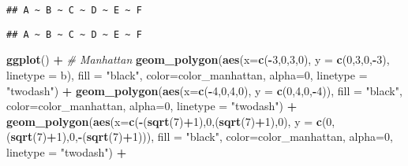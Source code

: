 \documentclass[]{article}
\newenvironment{Shaded}{\begin{snugshade}}{\end{snugshade}}
\newcommand{\CommentTok}[1]{\textcolor[rgb]{0.56,0.35,0.01}{\textit{#1}}}
\newcommand{\DataTypeTok}[1]{\textcolor[rgb]{0.13,0.29,0.53}{#1}}
\newcommand{\DecValTok}[1]{\textcolor[rgb]{0.00,0.00,0.81}{#1}}
\newcommand{\KeywordTok}[1]{\textcolor[rgb]{0.13,0.29,0.53}{\textbf{#1}}}
\newcommand{\NormalTok}[1]{#1}
\newcommand{\OperatorTok}[1]{\textcolor[rgb]{0.81,0.36,0.00}{\textbf{#1}}}
\newcommand{\StringTok}[1]{\textcolor[rgb]{0.31,0.60,0.02}{#1}}
\begin{document}
\begin{verbatim}
## A ~ B ~ C ~ D ~ E ~ F
\end{verbatim}

\begin{verbatim}
## A ~ B ~ C ~ D ~ E ~ F
\end{verbatim}

\begin{Shaded}
\begin{Highlighting}[]
\KeywordTok{ggplot}\NormalTok{() }\OperatorTok{+}
\StringTok{  }\CommentTok{# Manhattan}
\StringTok{  }\KeywordTok{geom_polygon}\NormalTok{(}\KeywordTok{aes}\NormalTok{(}\DataTypeTok{x=}\KeywordTok{c}\NormalTok{(}\OperatorTok{-}\DecValTok{3}\NormalTok{,}\DecValTok{0}\NormalTok{,}\DecValTok{3}\NormalTok{,}\DecValTok{0}\NormalTok{), }\DataTypeTok{y =} \KeywordTok{c}\NormalTok{(}\DecValTok{0}\NormalTok{,}\DecValTok{3}\NormalTok{,}\DecValTok{0}\NormalTok{,}\OperatorTok{-}\DecValTok{3}\NormalTok{), }\DataTypeTok{linetype =}\NormalTok{ b), }\DataTypeTok{fill =} \StringTok{"black"}\NormalTok{, }\DataTypeTok{color=}\NormalTok{color_manhattan, }\DataTypeTok{alpha=}\DecValTok{0}\NormalTok{, }\DataTypeTok{linetype =} \StringTok{"twodash"}\NormalTok{) }\OperatorTok{+}
\StringTok{  }\KeywordTok{geom_polygon}\NormalTok{(}\KeywordTok{aes}\NormalTok{(}\DataTypeTok{x=}\KeywordTok{c}\NormalTok{(}\OperatorTok{-}\DecValTok{4}\NormalTok{,}\DecValTok{0}\NormalTok{,}\DecValTok{4}\NormalTok{,}\DecValTok{0}\NormalTok{), }\DataTypeTok{y =} \KeywordTok{c}\NormalTok{(}\DecValTok{0}\NormalTok{,}\DecValTok{4}\NormalTok{,}\DecValTok{0}\NormalTok{,}\OperatorTok{-}\DecValTok{4}\NormalTok{)), }\DataTypeTok{fill =} \StringTok{"black"}\NormalTok{, }\DataTypeTok{color=}\NormalTok{color_manhattan, }\DataTypeTok{alpha=}\DecValTok{0}\NormalTok{, }\DataTypeTok{linetype =} \StringTok{"twodash"}\NormalTok{) }\OperatorTok{+}
\StringTok{  }\KeywordTok{geom_polygon}\NormalTok{(}\KeywordTok{aes}\NormalTok{(}\DataTypeTok{x=}\KeywordTok{c}\NormalTok{(}\OperatorTok{-}\NormalTok{(}\KeywordTok{sqrt}\NormalTok{(}\DecValTok{7}\NormalTok{)}\OperatorTok{+}\DecValTok{1}\NormalTok{),}\DecValTok{0}\NormalTok{,(}\KeywordTok{sqrt}\NormalTok{(}\DecValTok{7}\NormalTok{)}\OperatorTok{+}\DecValTok{1}\NormalTok{),}\DecValTok{0}\NormalTok{), }\DataTypeTok{y =} \KeywordTok{c}\NormalTok{(}\DecValTok{0}\NormalTok{,(}\KeywordTok{sqrt}\NormalTok{(}\DecValTok{7}\NormalTok{)}\OperatorTok{+}\DecValTok{1}\NormalTok{),}\DecValTok{0}\NormalTok{,}\OperatorTok{-}\NormalTok{(}\KeywordTok{sqrt}\NormalTok{(}\DecValTok{7}\NormalTok{)}\OperatorTok{+}\DecValTok{1}\NormalTok{))), }\DataTypeTok{fill =} \StringTok{"black"}\NormalTok{, }\DataTypeTok{color=}\NormalTok{color_manhattan, }\DataTypeTok{alpha=}\DecValTok{0}\NormalTok{, }\DataTypeTok{linetype =} \StringTok{"twodash"}\NormalTok{) }\OperatorTok{+}

\end{Highlighting}
\end{Shaded}
\end{document}
